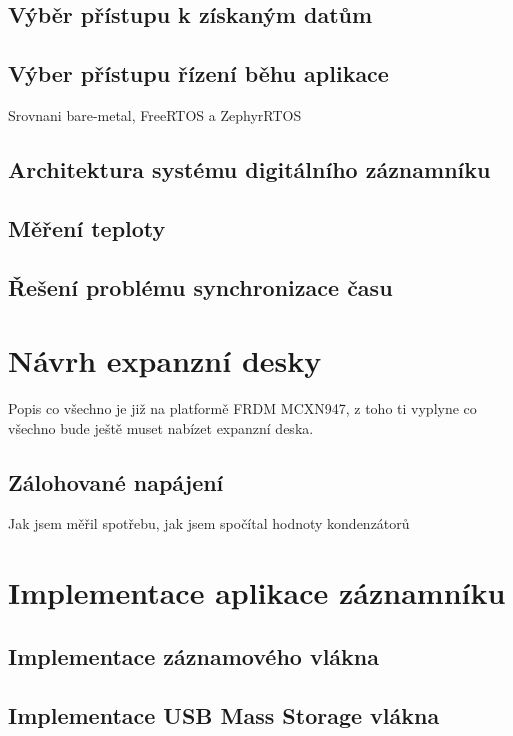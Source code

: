 \section{Výběr přístupu k získaným datům}

\section{Výber přístupu řízení běhu aplikace}
Srovnani bare-metal, FreeRTOS a ZephyrRTOS

\section{Architektura systému digitálního záznamníku}

\section{Měření teploty}

\section{Řešení problému synchronizace času}

\chapter{Návrh expanzní desky}
Popis co všechno je již na platformě FRDM MCXN947, z toho ti vyplyne co všechno bude ještě muset nabízet expanzní deska.

\section{Zálohované napájení}
Jak jsem měřil spotřebu, jak jsem spočítal hodnoty kondenzátorů

\chapter{Implementace aplikace záznamníku}

\section{Implementace záznamového vlákna}

\section{Implementace USB Mass Storage vlákna}

